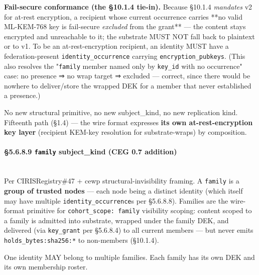 \documentclass[11pt]{article}
\begin{document}
\textbf{Fail-secure conformance (the §10.1.4 tie-in).} Because §10.1.4 \textit{mandates} v2 for at-rest encryption, a recipient whose current occurrence carries **no valid ML-KEM-768 key is fail-secure \textit{excluded} from the grant** — the content stays encrypted and unreachable to it; the substrate MUST NOT fall back to plaintext or to v1. To be an at-rest-encryption recipient, an identity MUST have a federation-present \texttt{identity\_occurrence} carrying \texttt{encryption\_pubkeys}. (This also resolves the "\texttt{family} member named only by \texttt{key\_id} with no occurrence" case: no presence ⇒ no wrap target ⇒ excluded — correct, since there would be nowhere to deliver/store the wrapped DEK for a member that never established a presence.)


No new structural primitive, no new subject\_kind, no new replication kind. Fifteenth path (§1.4) — the wire format expresses \textbf{its own at-rest-encryption key layer} (recipient KEM-key resolution for substrate-wraps) by composition.


\paragraph{§5.6.8.9 \texttt{family} subject\_kind (CEG 0.7 addition)}\mbox{}\\


Per CIRISRegistry\#47 + cewp structural-invisibility framing. A \texttt{family} is a \textbf{group of trusted nodes} — each node being a distinct identity (which itself may have multiple \texttt{identity\_occurrence}s per §5.6.8.8). Families are the wire-format primitive for \texttt{cohort\_scope: family} visibility scoping: content scoped to a family is admitted into substrate, wrapped under the family DEK, and delivered (via \texttt{key\_grant} per §5.6.8.4) to all current members — but never emits \texttt{holds\_bytes:sha256:*} to non-members (§10.1.4).


One identity MAY belong to multiple families. Each family has its own DEK and its own membership roster.
\end{document}
